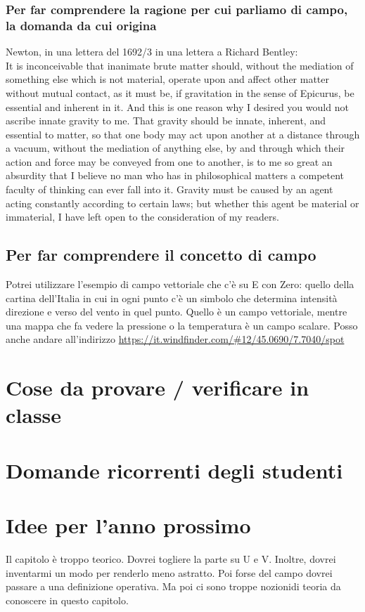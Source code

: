\documentclass[11pt]{report}
\begin{document}
 \subsubsection*{Per far comprendere la ragione per cui parliamo di campo, la domanda da cui origina}
 Newton, in una lettera del 1692/3 in una lettera a Richard Bentley:\\
 It is inconceivable that inanimate brute matter should, without the mediation of something else which is not material, operate upon and affect other matter without mutual contact, as it must be, if gravitation in the sense of Epicurus, be essential and inherent in it. And this is one reason why I desired you would not ascribe innate gravity to me. That gravity should be innate, inherent, and essential to matter, so that one body may act upon another at a distance through a vacuum, without the mediation of anything else, by and through which their action and force may be conveyed from one to another, is to me so great an absurdity that I believe no man who has in philosophical matters a competent faculty of thinking can ever fall into it. Gravity must be caused by an agent acting constantly according to certain laws; but whether this agent be material or immaterial, I have left open to the consideration of my readers. 

 \subsection*{Per far comprendere il concetto di campo} 
 Potrei utilizzare l'esempio di campo vettoriale che c'è su E con Zero: quello della cartina dell'Italia in cui in ogni punto c'è un simbolo che determina intensità direzione e verso del vento in quel punto. Quello è un campo vettoriale, mentre una mappa che fa vedere la pressione o la temperatura è un campo scalare.
Posso anche andare all'indirizzo \url{https://it.windfinder.com/#12/45.0690/7.7040/spot}


\section*{Cose da provare / verificare in classe}

\section*{Domande ricorrenti degli studenti}

\section*{Idee per l'anno prossimo}
Il capitolo è troppo teorico. Dovrei togliere la parte su U e V. Inoltre, dovrei inventarmi un modo per renderlo meno astratto. Poi forse del campo dovrei passare a una definizione operativa. Ma poi ci sono troppe nozionidi teoria da conoscere in questo capitolo.
\end{document}

